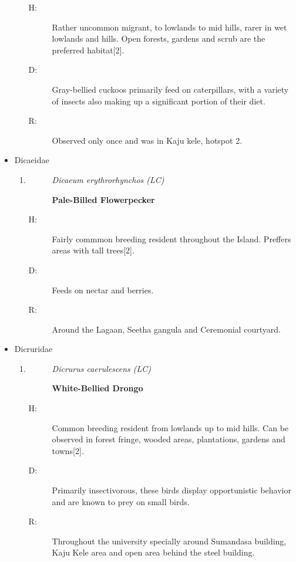 \begin{itemize}
\begin{enumerate}
\begin{description}%
\item[H: ]%
Rather uncommon migrant, to lowlands to mid hills, rarer in wet lowlands and hills. Open forests, gardens and scrub are the preferred habitat{[}2{]}.%
\item[D: ]%
Gray{-}bellied cuckoos primarily feed on caterpillars, with a variety of insects also making up a significant portion of their diet.%
\item[R: ]%
Observed only once and was in Kaju kele, hotspot 2.%
\end{description}%
\end{enumerate}%
\item%
Dicaeidae%
\begin{enumerate}%
\item%
\begin{description}%
\item[]%
\textit{Dicaeum erythrorhynchos (LC)}%
\item[]%
\textbf{Pale{-}Billed Flowerpecker}%
\end{description}%
\begin{description}%
\item[H: ]%
Fairly commmon breeding resident throughout the Island. Preffers areas with tall trees{[}2{]}.%
\item[D: ]%
Feeds on nectar and berries.%
\item[R: ]%
Around the Lagaan, Seetha gangula and Ceremonial courtyard.%
\end{description}%
\end{enumerate}%
\item%
Dicruridae%
\begin{enumerate}%
\item%
\begin{description}%
\item[]%
\textit{Dicrurus caerulescens (LC)}%
\item[]%
\textbf{White{-}Bellied Drongo}%
\end{description}%
\begin{description}%
\item[H: ]%
Common breeding resident from lowlands up to mid hills. Can be observed in forest fringe, wooded areas, plantations, gardens and towns{[}2{]}.%
\item[D: ]%
Primarily insectivorous, these birds display opportunistic behavior and are known to prey on small birds.%
\item[R: ]%
Throughout the university specially around Sumandasa building, Kaju Kele area and open area behind the steel building.%

\end{description}
\end{enumerate}
\end{itemize}
